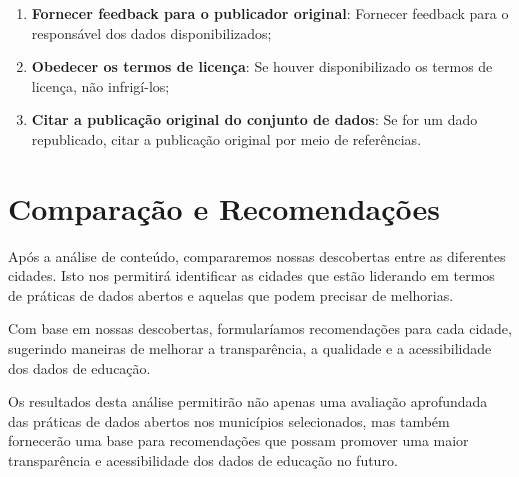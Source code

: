 \begin{enumerate}
    \item \textbf{Fornecer feedback para o publicador original}: Fornecer feedback para o responsável dos dados disponibilizados;

    \item \textbf{Obedecer os termos de licença}: Se houver disponibilizado os termos de licença, não infrigí-los;

    \item \textbf{Citar a publicação original do conjunto de dados}: Se for um dado republicado, citar a publicação original por meio de referências.

\end{enumerate}

\section{Comparação e Recomendações}

Após a análise de conteúdo, compararemos nossas descobertas entre as diferentes cidades. Isto nos permitirá identificar as cidades que estão liderando em termos de práticas de dados abertos e aquelas que podem precisar de melhorias.

Com base em nossas descobertas, formularíamos recomendações para cada cidade, sugerindo maneiras de melhorar a transparência, a qualidade e a acessibilidade dos dados de educação.

Os resultados desta análise permitirão não apenas uma avaliação aprofundada das práticas de dados abertos nos municípios selecionados, mas também fornecerão uma base para recomendações que possam promover uma maior transparência e acessibilidade dos dados de educação no futuro.

